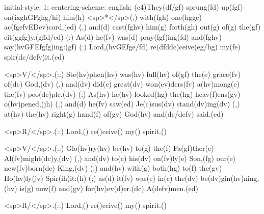 initial-style: 1;
centering-scheme: english;
(c4)They(df/gf) sprung(fd) up(fgf) on(ixghGFghg/hi) him(h) <sp>*</sp>(,) with(fgh) one(hgge) ac(fgefvEDev)cord,(ed) (,) and(d) cast(fghv) him(g) forth(gh) out(g) of(g) the(gf) cit(ggfg)y.(gffd/ed) (:) As(d) he(fv) was(d) pray(fgf)ing(fd) and(fghv) say(hvGFEfgfg)ing:(gf) (:) Lord,(hvGEfge/fd) re(dfddc)ceive(eg/hg) my(fe) spir(dc/defv)it.(ed)

<sp>V/</sp>.(::) Ste(hv)phen(hv) was(hv) full(hv) of(gf) the(e) grace(fv) of(dc) God,(dv) (,) and(dv) did(c) great(dv) won(ev)ders(fv) a(hv)mong(e) the(fv) peo(dc)ple.(dv) (;) As(hv) he(hv) looked(hg) the(hg) heav(f)ens(gv) o(hv)pened,(jh) (,) and(d) he(fv) saw(ed) Je(c)sus(dv) stand(dv)ing(dv) (,) at(hv) the(hv) right(g) hand(f) of(gv) God(hv) and(dc/defv) said.(ed)

<sp>R/</sp>.(::) Lord,() re()ceive() my() spirit.()

<sp>V/</sp>.(::) Glo(hv)ry(hv) be(hv) to(g) the(f) Fa(gf)ther(e) Al(fv)might(dc)y,(dv) (,) and(dv) to(c) his(dv) on(fv)ly(e) Son,(fg) our(e) new(fv)born(dc) King,(dv) (;) and(hv) with(g) both(hg) to(f) the(gv) Ho(hv)ly(jv) Spir(ih)it:(h) (;) as(d) it(fv) was(e) in(c) the(dv) be(dv)gin(hv)ning,(hv) is(g) now(f) and(gv) for(hv)ev(d)er.(dc) A(defv)men.(ed)

<sp>R/</sp>.(::) Lord,() re()ceive() my() spirit.()